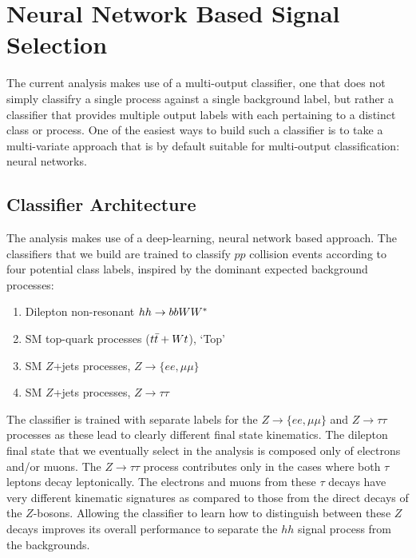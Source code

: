 \section{Neural Network Based Signal Selection}
\label{sec:hh_strategy}

%
%


The current analysis makes use of a multi-output classifier, one that does not simply classifry
a single process against a single background label, but rather a classifier that provides multiple
output labels with each pertaining to a distinct class or process.
One of the easiest ways to build such a classifier is to take a multi-variate approach that
is by default suitable for multi-output classification: neural networks.

\subsection{Classifier Architecture}
\label{sec:nn_arch}

The analysis makes use of a deep-learning, neural network based approach.
The classifiers that we build are trained to classify $pp$ collision events according to
four potential class labels, inspired by the dominant expected background processes:
\begin{enumerate}
    \item Dilepton non-resonant $hh \rightarrow bbWW^*$
    \item SM top-quark processes ($t\bar{t} + Wt$), `Top'
    \item SM $Z$+jets processes, $Z \rightarrow \{ee,\mu\mu\}$
    \item SM $Z$+jets processes, $Z \rightarrow \tau\tau$
\end{enumerate}
The classifier is trained with separate labels for the $Z \rightarrow \{ee,\mu\mu\}$ and
$Z \rightarrow \tau\tau$ processes as these lead to clearly different final state kinematics.
The dilepton final state that we eventually select in the analysis is composed only of electrons and/or muons.
The $Z \rightarrow \tau\tau$ process contributes only in the cases where both $\tau$ leptons decay
leptonically.
The electrons and muons from these $\tau$ decays have very different kinematic signatures as compared
to those from the direct decays of the $Z$-bosons.
Allowing the classifier to learn how to distinguish between these $Z$ decays improves its overall performance
to separate the $hh$ signal process from the backgrounds.

